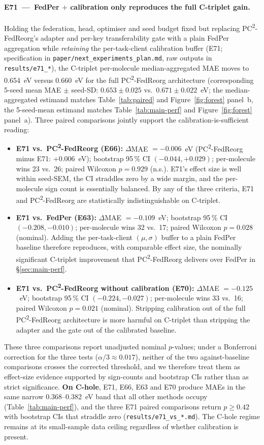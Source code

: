 \documentclass[11pt,a4paper]{article}
\newcommand{\PC}{PC\textsuperscript{2}-FedReorg}
\begin{document}
\paragraph{E71~---~FedPer $+$ calibration only reproduces the full C-triplet gain.} Holding the federation, head, optimiser and seed budget fixed but replacing \PC{}'s adapter and per-key transferability gate with a plain FedPer aggregation while \emph{retaining} the per-task-client calibration buffer (E71; specification in \texttt{paper/next\_experiments\_plan.md}, raw outputs in \texttt{results/e71\_*}), the C-triplet per-molecule median-aggregated MAE moves to \SI{0.654}{\eV} versus \SI{0.660}{\eV} for the full \PC{} architecture (corresponding 5-seed mean MAE $\pm$ seed-SD: $0.653 \pm 0.025$ vs.\ $0.671 \pm 0.022$~eV; the median-aggregated estimand matches Table~\ref{tab:paired} and Figure~\ref{fig:forest} panel~b, the 5-seed-mean estimand matches Table~\ref{tab:main-perf} and Figure~\ref{fig:forest} panel~a). Three paired comparisons jointly support the calibration-is-sufficient reading:

\begin{itemize}
  \item \textbf{E71 vs.\ \PC{} (E66):} $\Delta$MAE $= -0.006$~eV (\PC{} minus E71: $+0.006$~eV); bootstrap 95\,\% CI $(-0.044, +0.029)$; per-molecule wins 23 vs.\ 26; paired Wilcoxon $p = 0.929$ (n.s.). E71's effect size is well within seed-SEM, the CI straddles zero by a wide margin, and the per-molecule sign count is essentially balanced. By any of the three criteria, E71 and \PC{} are statistically indistinguishable on C-triplet.
  \item \textbf{E71 vs.\ FedPer (E63):} $\Delta$MAE $= -0.109$~eV; bootstrap 95\,\% CI $(-0.208, -0.010)$; per-molecule wins 32 vs.\ 17; paired Wilcoxon $p = 0.028$ (nominal). Adding the per-task-client $(\mu, \sigma)$ buffer to a plain FedPer baseline therefore reproduces, with comparable effect size, the nominally significant C-triplet improvement that \PC{} delivers over FedPer in \S\ref{sec:main-perf}.
  \item \textbf{E71 vs.\ \PC{} without calibration (E70):} $\Delta$MAE $= -0.125$~eV; bootstrap 95\,\% CI $(-0.224, -0.027)$; per-molecule wins 33 vs.\ 16; paired Wilcoxon $p = 0.021$ (nominal). Stripping calibration out of the full \PC{} architecture is more harmful on C-triplet than stripping the adapter and the gate out of the calibrated baseline.
\end{itemize}

These three comparisons report unadjusted nominal $p$-values; under a Bonferroni correction for the three tests ($\alpha/3 \approx 0.017$), neither of the two against-baseline comparisons crosses the corrected threshold, and we therefore treat them as effect-size evidence supported by sign-counts and bootstrap CIs rather than as strict significance. \textbf{On C-hole}, E71, E66, E63 and E70 produce MAEs in the same narrow \SI{0.368}{}--\SI{0.382}{\eV} band that all other methods occupy (Table~\ref{tab:main-perf}), and the three E71 paired comparisons return $p \ge 0.42$ with bootstrap CIs that straddle zero (\texttt{results/e71\_vs\_*.md}). The C-hole regime remains at its small-sample data ceiling regardless of whether calibration is present.
\end{document}
